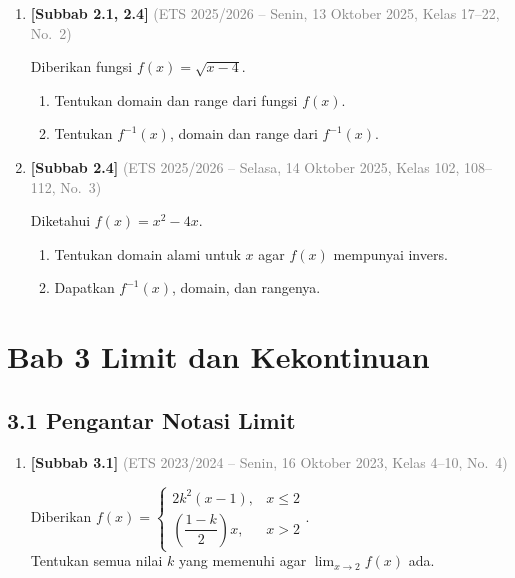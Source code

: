 \documentclass[10pt,openany,a4paper]{article}
\theoremstyle{definition}
\theoremstyle{definition}
\theoremstyle{plain}
\begin{document}
\begin{enumerate}
    \item \textbf{[Subbab 2.1, 2.4]} {\footnotesize\textcolor{gray}{(ETS 2025/2026 -- Senin, 13 Oktober 2025, Kelas 17--22, No.~2)}}\par
    Diberikan fungsi $f(x)=\sqrt{x-4}$.
    \begin{enumerate}
        \item Tentukan domain dan range dari fungsi $f(x)$.
        \item Tentukan $f^{-1}(x)$, domain dan range dari $f^{-1}(x)$.
    \end{enumerate}

    \item \textbf{[Subbab 2.4]} {\footnotesize\textcolor{gray}{(ETS 2025/2026 -- Selasa, 14 Oktober 2025, Kelas 102, 108--112, No.~3)}}\par
    Diketahui $f(x)=x^2-4x$.
    \begin{enumerate}
        \item Tentukan domain alami untuk $x$ agar $f(x)$ mempunyai invers.
        \item Dapatkan $f^{-1}(x)$, domain, dan rangenya.
    \end{enumerate}

\end{enumerate}
\newpage

\section*{Bab 3 \quad Limit dan Kekontinuan}
\subsection*{3.1 \quad Pengantar Notasi Limit}
\begin{enumerate}
\setcounter{enumi}{0}
    \item \textbf{[Subbab 3.1]} {\footnotesize\textcolor{gray}{(ETS 2023/2024 -- Senin, 16 Oktober 2023, Kelas 4--10, No.~4)}}\par
    Diberikan $f(x)=\begin{cases}
        2k^2(x-1), & x\leq 2\\
        \left(\dfrac{1-k}{2}\right)x, & x>2
    \end{cases}$.\\
    Tentukan semua nilai $k$ yang memenuhi agar $\displaystyle\lim_{x\to 2}f(x)$ ada.

\end{enumerate}
\end{document}
